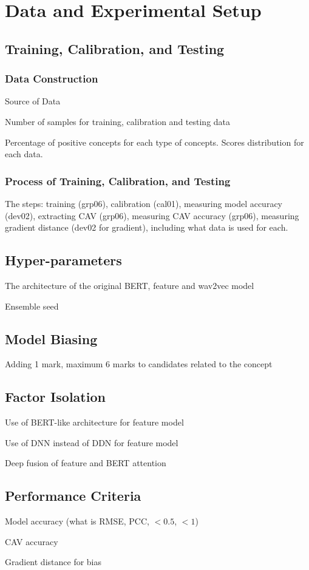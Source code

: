 \chapter{Data and Experimental Setup} \label{chap:setup}

\section{Training, Calibration, and Testing}

\subsection{Data Construction}
Source of Data

Number of samples for training, calibration and testing data

Percentage of positive concepts for each type of concepts. Scores distribution for each data.

\subsection{Process of Training, Calibration, and Testing}
The steps: training (grp06), calibration (cal01), measuring model accuracy (dev02), extracting CAV (grp06), measuring CAV accuracy (grp06), measuring gradient distance (dev02 for gradient), including what data is used for each.

\section{Hyper-parameters}

The architecture of the original BERT, feature and wav2vec model

Ensemble seed

\section{Model Biasing}

Adding 1 mark, maximum 6 marks to candidates related to the concept

\section{Factor Isolation}

Use of BERT-like architecture for feature model

Use of DNN instead of DDN for feature model

Deep fusion of feature and BERT attention

\section{Performance Criteria}
Model accuracy (what is RMSE, PCC, $<0.5$, $<1$)

CAV accuracy

Gradient distance for bias